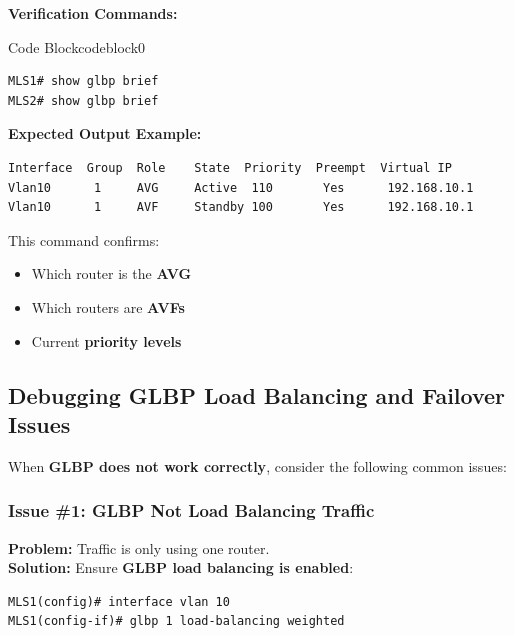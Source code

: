 \documentclass[a4paper]{book}
\begin{document}
\textbf{Verification Commands:}

\vspace{1.5em}


\begin{ocg}{Code Block}{codeblock}{0}

\vspace{0.5cm}

\begin{lstlisting}
MLS1# show glbp brief
MLS2# show glbp brief
\end{lstlisting}
\end{ocg}


\textbf{Expected Output Example:}
\begin{lstlisting}
Interface  Group  Role    State  Priority  Preempt  Virtual IP
Vlan10      1     AVG     Active  110       Yes      192.168.10.1
Vlan10      1     AVF     Standby 100       Yes      192.168.10.1
\end{lstlisting}

This command confirms:
\begin{itemize}
\item \checkmark \; Which router is the \textbf{AVG}
\item \checkmark \; Which routers are \textbf{AVFs}
\item \checkmark \; Current \textbf{priority levels}
\end{itemize}

\subsection{Debugging GLBP Load Balancing and Failover Issues}
When \textbf{GLBP does not work correctly}, consider the following common issues:

\subsubsection{Issue \#1: GLBP Not Load Balancing Traffic}
\textbf{Problem:} Traffic is only using one router.\\
\textbf{Solution:} Ensure \textbf{GLBP load balancing is enabled}:
\begin{lstlisting}
MLS1(config)# interface vlan 10
MLS1(config-if)# glbp 1 load-balancing weighted
\end{lstlisting}
\end{document}

